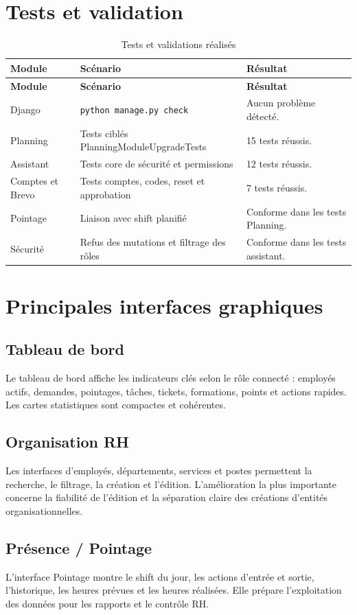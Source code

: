 \documentclass[12pt,a4paper]{report}
\begin{document}
\section{Tests et validation}
\begin{longtable}{p{5cm}p{5cm}p{4cm}}
\caption{Tests et validations réalisés}\label{tab:tests}\\
\toprule
\textbf{Module} & \textbf{Scénario} & \textbf{Résultat}\\
\midrule
\endfirsthead
\toprule
\textbf{Module} & \textbf{Scénario} & \textbf{Résultat}\\
\midrule
\endhead
Django & \texttt{python manage.py check} & Aucun problème détecté.\\
Planning & Tests ciblés PlanningModuleUpgradeTests & 15 tests réussis.\\
Assistant & Tests core de sécurité et permissions & 12 tests réussis.\\
Comptes et Brevo & Tests comptes, codes, reset et approbation & 7 tests réussis.\\
Pointage & Liaison avec shift planifié & Conforme dans les tests Planning.\\
Sécurité & Refus des mutations et filtrage des rôles & Conforme dans les tests assistant.\\
\bottomrule
\end{longtable}

\section{Principales interfaces graphiques}
\subsection{Tableau de bord}
Le tableau de bord affiche les indicateurs clés selon le rôle connecté : employés actifs, demandes, pointages, tâches, tickets, formations, points et actions rapides. Les cartes statistiques sont compactes et cohérentes.

\subsection{Organisation RH}
Les interfaces d'employés, départements, services et postes permettent la recherche, le filtrage, la création et l'édition. L'amélioration la plus importante concerne la fiabilité de l'édition et la séparation claire des créations d'entités organisationnelles.

\subsection{Présence / Pointage}
L'interface Pointage montre le shift du jour, les actions d'entrée et sortie, l'historique, les heures prévues et les heures réalisées. Elle prépare l'exploitation des données pour les rapports et le contrôle RH.
\end{document}
